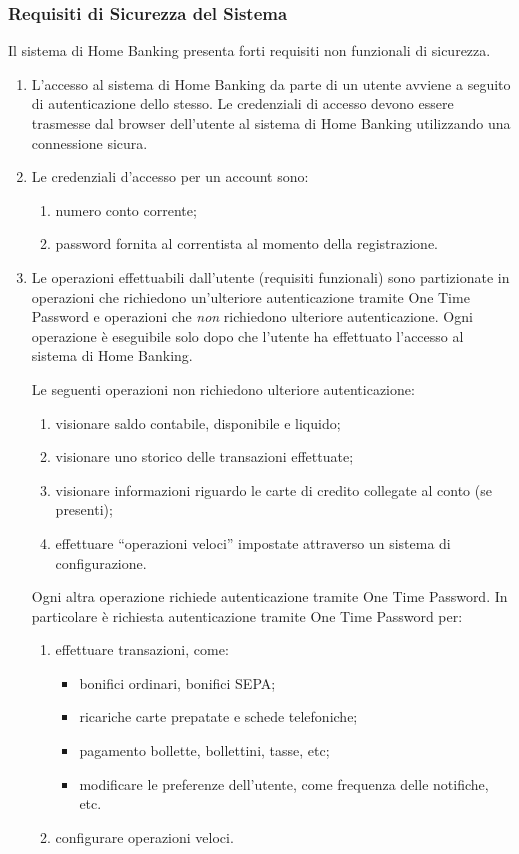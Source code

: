 \subsubsection{Requisiti di Sicurezza del Sistema}
\label{sec:utente:non-funzionali:sicurezza}

Il sistema di Home Banking presenta forti requisiti non funzionali di sicurezza.

\begin{enumerate}
	\item \label{itm:utente:non-funzionali:sicurezza:accesso} L'accesso al sistema di Home Banking da parte di un utente avviene a seguito di autenticazione dello stesso.
		Le credenziali di accesso devono essere trasmesse dal browser dell'utente al sistema di Home Banking utilizzando una connessione sicura.
	\item Le credenziali d'accesso per un account sono:
		\begin{enumerate}
			\item numero conto corrente;
			\item password fornita al correntista al momento della registrazione.
		\end{enumerate}
	\item Le operazioni effettuabili dall'utente (requisiti funzionali) sono partizionate in operazioni che richiedono un'ulteriore autenticazione tramite One Time Password e operazioni che \emph{non} richiedono ulteriore autenticazione.
	Ogni operazione \`e eseguibile solo dopo che l'utente ha effettuato l'accesso al sistema di Home Banking.

	Le seguenti operazioni non richiedono ulteriore autenticazione:
	\begin{enumerate}
		\item visionare saldo contabile, disponibile e liquido;
		\item visionare uno storico delle transazioni effettuate;
		\item visionare informazioni riguardo le carte di credito collegate al conto (se presenti);
		\item effettuare ``operazioni veloci'' impostate attraverso un sistema di configurazione.
	\end{enumerate}
	
	Ogni altra operazione richiede autenticazione tramite One Time Password.
	In particolare \`e richiesta autenticazione tramite One Time Password per:
	\begin{enumerate}
		\item effettuare transazioni, come:
		\begin{itemize}
			\item bonifici ordinari, bonifici SEPA;
			\item ricariche carte prepatate e schede telefoniche;
			\item pagamento bollette, bollettini, tasse, etc;
			\item modificare le preferenze dell'utente, come frequenza delle notifiche, etc.
		\end{itemize}
		\item configurare operazioni veloci.
	\end{enumerate}
\end{enumerate}

